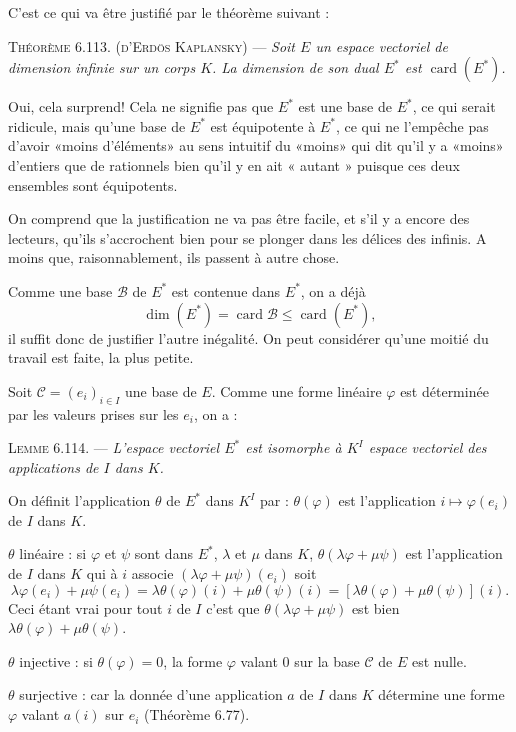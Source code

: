 C'est ce qui va être justifié par le théorème suivant :

\medskip\noindent\textsc{Théorème 6.113. (d'Erdös Kaplansky)} --- \emph{Soit $E$ un espace vectoriel de dimension infinie sur un corps $K$. La dimension de son dual $E^*$ est $\operatorname{card}(E^*)$.}

Oui, cela surprend! Cela ne signifie pas que $E^*$ est une base de $E^*$, ce qui serait ridicule, mais qu'une base de $E^*$ est équipotente à $E^*$, ce qui ne l'empêche pas d'avoir «moins d'éléments» au sens intuitif du «moins» qui dit qu'il y a «moins» d'entiers que de rationnels bien qu'il y en ait « autant » puisque ces deux ensembles sont équipotents.

On comprend que la justification ne va pas être facile, et s'il y a encore des lecteurs, qu'ils s'accrochent bien pour se plonger dans les délices des infinis. A moins que, raisonnablement, ils passent à autre chose.

Comme une base $\mathcal B$ de $E^*$ est contenue dans $E^*$, on a déjà
\[
\dim(E^*)=\operatorname{card}\mathcal B\le\operatorname{card}(E^*),
\]
il suffit donc de justifier l'autre inégalité. On peut considérer qu'une moitié du travail est faite, la plus petite.

Soit $\mathcal C=(e_i)_{i\in I}$ une base de $E$. Comme une forme linéaire $\varphi$ est déterminée par les valeurs prises sur les $e_i$, on a :

\medskip\noindent\textsc{Lemme 6.114.} --- \emph{L'espace vectoriel $E^*$ est isomorphe à $K^I$ espace vectoriel des applications de $I$ dans $K$.}

On définit l'application $\theta$ de $E^*$ dans $K^I$ par : $\theta(\varphi)$ est l'application $i\longmapsto\varphi(e_i)$ de $I$ dans $K$.

$\theta$ linéaire : si $\varphi$ et $\psi$ sont dans $E^*$, $\lambda$ et $\mu$ dans $K$, $\theta(\lambda\varphi+\mu\psi)$ est l'application de $I$ dans $K$ qui à $i$ associe $(\lambda\varphi+\mu\psi)(e_i)$ soit
\[
\lambda\varphi(e_i)+\mu\psi(e_i)=\lambda\theta(\varphi)(i)+\mu\theta(\psi)(i)
=[\lambda\theta(\varphi)+\mu\theta(\psi)](i).
\]
Ceci étant vrai pour tout $i$ de $I$ c'est que $\theta(\lambda\varphi+\mu\psi)$ est bien $\lambda\theta(\varphi)+\mu\theta(\psi)$.

$\theta$ injective : si $\theta(\varphi)=0$, la forme $\varphi$ valant 0 sur la base $\mathcal C$ de $E$ est nulle.

$\theta$ surjective : car la donnée d'une application $a$ de $I$ dans $K$ détermine une forme $\varphi$ valant $a(i)$ sur $e_i$ (Théorème 6.77). \bookend

